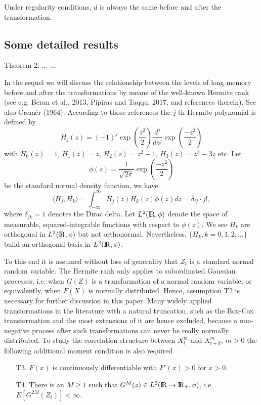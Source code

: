 \documentclass[12pt]{article}
\newcommand\inner[2]{\langle #1, #2 \rangle}
\newcommand{\real}{\mbox{I}\hspace{-2pt}\mbox{R}}
\begin{document}
Under regularity conditions, $d$ is always the same before and after the transformation. 


\subsection{Some detailed results}

Theorem 2: ... ...


In the sequel we will discuss the relationship between the levels of long memory before and after the transformations by means of the well-known Hermite rank (see e.g. Beran et al., 2013, Pipiras and Taqqu, 2017, and references therein). See also Crem{\'e}r (1964). According to those references the $j$-th Hermite polynomial is defined by
\begin{equation}
H_j(z)=(-1)^j \exp\left(\frac{z^2}{2}\right)\frac{d^j}{dz^j}\exp\left(\frac{-z^2}{2}\right)
\end{equation}\label{Hj}
with $H_0(z)=1$, $H_1(z)=z$, $H_2(z)=z^2-1$, $H_3(z)=z^3-3z$ etc. Let $$\phi(z)=\frac{1}{\sqrt{2\pi}}\exp\left(\frac{-z^2}{2}\right)$$ be the standard normal density function, we have $$\inner{H_j}{H_k}=\int_{-\infty}^\infty H_j(z) H_k(z) \phi(z) dz =\delta_{ij}\cdot j!,$$ where $\delta_{jk}=1$ denotes the Dirac delta. 
Let $L^2(\real, \phi)$ denote the space of measurable, squared-integrable functions with respect to $\phi(z)$. We see $H_k$ are orthogonal in $L^2(\real, \phi)$ but not orthonormal. Nevertheless, $\{H_k, k=0, 1, 2, ...\}$ build an orthogonal basis in $L^2(\real, \phi)$. 



To this end it is assumed without loss of generality that $Z_t$ is a standard normal random variable. The Hermite rank only applies to subordinated Gaussian processes, i.e. when $G(Z)$ is a transformation of a normal random variable, or equivalently, when $F(X)$ is normally distributed. Hence, assumption T2 is necessary for further discussion in this paper. Many widely applied transformations in the literature with a natural truncation, such as the Box-Cox transformation and the most extensions of it are hence excluded, because a non-negative process after such transformations can never be really normally distributed. 
To study the correlation structure between $X_t^m$ and $X_{t+k}^m$, $m>0$ the following additional moment condition is also required
\begin{enumerate}
\item[T3.] $F(x)$ is continuously differentiable with $F'(x)>0$ for $x>0$.
\item[T4.] There is an $M\ge 1$ such that $G^{M}(z)\in L^2(\real\rightarrow\real_+, \phi)$, i.e. $E[G^{2M}(Z_t)]<\infty$.
\end{enumerate}
\end{document}
